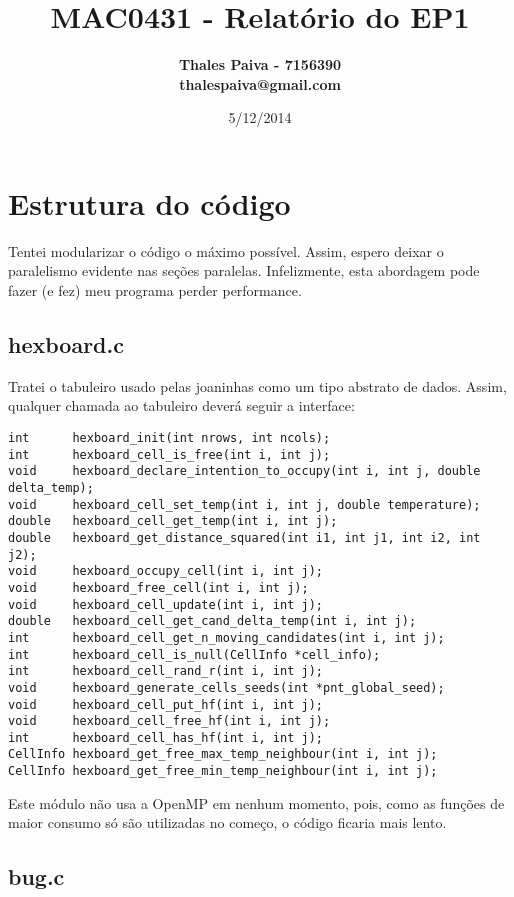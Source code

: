 \documentclass[a4paper,11pt]{article} %
\title{
	\textbf{
        MAC0431 - Relatório do EP1
    }
}
\author	{
	\bf{Thales Paiva - 7156390}     \\
	thalespaiva@gmail.com       \\
}
\date{5/12/2014}
\begin{document}
\maketitle
\tableofcontents
\pagebreak

\section{Estrutura do código}

Tentei modularizar o código o máximo possível. Assim, espero deixar o paralelismo evidente nas seções paralelas. Infelizmente, esta abordagem pode fazer (e fez) meu programa perder performance.

\subsection{hexboard.c}

Tratei o tabuleiro usado pelas joaninhas como um tipo abstrato de dados. Assim, qualquer chamada ao tabuleiro deverá seguir a interface:

\begin{verbatim}
int      hexboard_init(int nrows, int ncols);
int      hexboard_cell_is_free(int i, int j);
void     hexboard_declare_intention_to_occupy(int i, int j, double delta_temp);
void     hexboard_cell_set_temp(int i, int j, double temperature);
double   hexboard_cell_get_temp(int i, int j);
double   hexboard_get_distance_squared(int i1, int j1, int i2, int j2);
void     hexboard_occupy_cell(int i, int j);
void     hexboard_free_cell(int i, int j);
void     hexboard_cell_update(int i, int j);
double   hexboard_cell_get_cand_delta_temp(int i, int j);
int      hexboard_cell_get_n_moving_candidates(int i, int j);
int      hexboard_cell_is_null(CellInfo *cell_info);
int      hexboard_cell_rand_r(int i, int j);
void     hexboard_generate_cells_seeds(int *pnt_global_seed);
void     hexboard_cell_put_hf(int i, int j);
void     hexboard_cell_free_hf(int i, int j);
int      hexboard_cell_has_hf(int i, int j);
CellInfo hexboard_get_free_max_temp_neighbour(int i, int j);
CellInfo hexboard_get_free_min_temp_neighbour(int i, int j);
\end{verbatim}

Este módulo não usa a OpenMP em nenhum momento, pois, como as funções de maior consumo só são utilizadas no começo, o código ficaria mais lento.

\subsection{bug.c}
\end{document}
